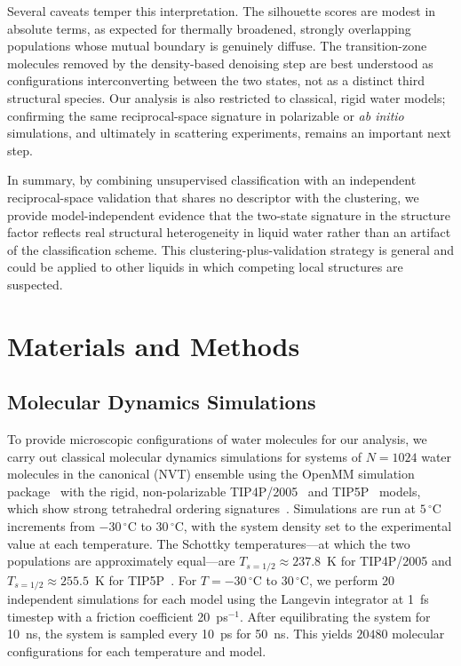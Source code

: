\documentclass[aps, amsmath,amssymb, reprint, twocolumn, superscriptaddress]{revtex4-2}
\begin{document}
Several caveats temper this interpretation. The silhouette scores are modest in absolute terms, as expected for thermally broadened, strongly overlapping populations whose mutual boundary is genuinely diffuse. The transition-zone molecules removed by the density-based denoising step are best understood as configurations interconverting between the two states, not as a distinct third structural species. Our analysis is also restricted to classical, rigid water models; confirming the same reciprocal-space signature in polarizable or \emph{ab initio} simulations, and ultimately in scattering experiments, remains an important next step.

In summary, by combining unsupervised classification with an independent reciprocal-space validation that shares no descriptor with the clustering, we provide model-independent evidence that the two-state signature in the structure factor reflects real structural heterogeneity in liquid water rather than an artifact of the classification scheme. This clustering-plus-validation strategy is general and could be applied to other liquids in which competing local structures are suspected.


\FloatBarrier


\section{Materials and Methods}

\subsection{Molecular Dynamics Simulations}
To provide microscopic configurations of water molecules for our analysis, we carry out classical molecular dynamics simulations for systems of $N = 1024$ water molecules in the canonical (NVT) ensemble using the OpenMM simulation package~\cite{eastman_openmm_2015} with the rigid, non-polarizable TIP4P/2005~\cite{abascal_general_2005} and TIP5P~\cite{mahoney_five-site_2000} models, which show strong tetrahedral ordering signatures~\cite{shi_direct_2020}. Simulations are run at $5\,^\circ$C increments from $-30\,^\circ$C to $30\,^\circ$C, with the system density set to the experimental value at each temperature. The Schottky temperatures---at which the two populations are approximately equal---are $T_{s=1/2} \approx 237.8$~K for TIP4P/2005 and $T_{s=1/2} \approx 255.5$~K for TIP5P~\cite{shi_direct_2020}. For $T=-30\,^\circ$C to $30\,^\circ$C, we perform 20 independent simulations for each model using the Langevin integrator at 1~fs timestep with a friction coefficient 20~ps$^{-1}$. After equilibrating the system for 10~ns, the system is sampled every 10~ps for 50~ns. This yields $20480$ molecular configurations for each temperature and model.
\end{document}
